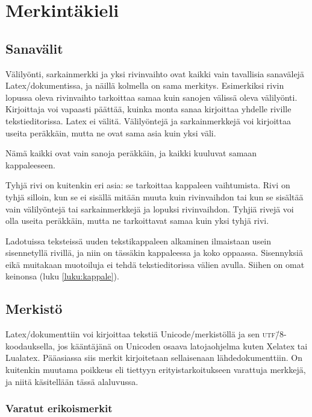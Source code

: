 \chapter{Merkintäkieli}

\section{Sanavälit}

Välilyönti, sarkainmerkki ja yksi rivinvaihto ovat kaikki vain
tavallisia sanavälejä Latex\-/dokumentissa, ja näillä kolmella on sama
merkitys. Esimerkiksi rivin lopussa oleva rivinvaihto tarkoittaa samaa
kuin sanojen välissä oleva välilyönti. Kirjoittaja voi vapaasti päättää,
kuinka monta sanaa kirjoittaa yhdelle riville tekstieditorissa. Latex ei
välitä. Välilyöntejä ja sarkainmerkkejä voi kirjoittaa useita peräkkäin,
mutta ne ovat sama asia kuin yksi väli.

\begin{koodilohkosis}
  Nämä      kaikki
       ovat            vain
  sanoja  peräkkäin,  ja      kaikki                kuuluvat
      samaan kappaleeseen.     
\end{koodilohkosis}

Tyhjä rivi on kuitenkin eri asia: se tarkoittaa kappaleen vaihtumista.
Rivi on tyhjä silloin, kun se ei sisällä mitään muuta kuin rivinvaihdon
tai kun se sisältää vain välilyöntejä tai sarkainmerkkejä ja lopuksi
rivinvaihdon. Tyhjiä rivejä voi olla useita peräkkäin, mutta ne
tarkoittavat samaa kuin yksi tyhjä rivi.

Ladotuissa teksteissä uuden tekstikappaleen alkaminen ilmaistaan usein
sisennetyllä rivillä, ja niin on tässäkin kappaleessa ja koko oppaassa.
Sisennyksiä eikä muitakaan muotoiluja ei tehdä tekstieditorissa välien
avulla. Siihen on omat keinonsa (luku \ref{luku:kappale}).

\section{Merkistö}

Latex\-/dokumenttiin voi kirjoittaa tekstiä Unicode\-/merkistöllä ja sen
\textsc{utf}\=/8\/-koodauksella, jos kääntäjänä on Unicoden osaava
la\-to\-ja\-oh\-jel\-ma kuten Xelatex tai Lualatex. Pääasiassa siis
merkit kirjoitetaan sellaisenaan lähdedokumenttiin. On kuitenkin muutama
poikkeus eli tiettyyn erityistarkoitukseen varattuja merkkejä, ja niitä
käsitellään tässä alaluvussa.

\subsection{Varatut erikoismerkit}

